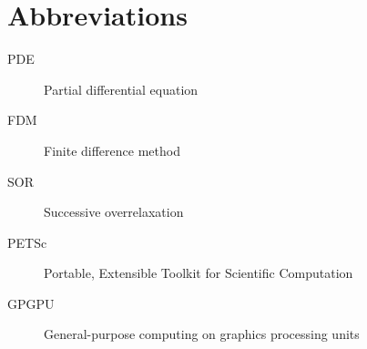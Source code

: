 \chapter{Abbreviations}

\begin{description}
	\item[PDE] Partial differential equation
	\item[FDM] Finite difference method
	\item[SOR] Successive overrelaxation
	\item[PETSc] Portable, Extensible Toolkit for Scientific Computation
	\item[GPGPU] General-purpose computing on graphics processing units
\end{description}
